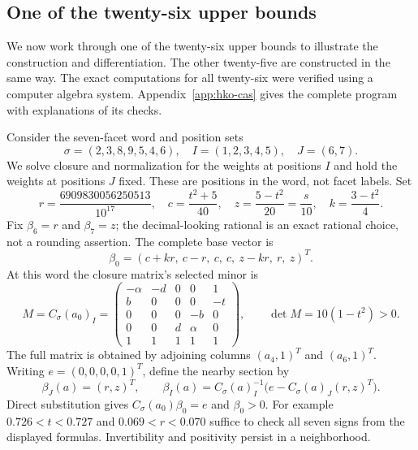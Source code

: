 \subsection*{One of the twenty-six upper bounds}

We now work through one of the twenty-six upper bounds to illustrate the
construction and differentiation. The other twenty-five are constructed
in the same way. The exact computations for all twenty-six were verified
using a computer algebra system. Appendix~\ref{app:hko-cas} gives the complete
program with explanations of its checks.

Consider the seven-facet word and position sets
\[
 \sigma=(2,3,8,9,5,4,6),\quad I=(1,2,3,4,5),\quad J=(6,7).
\]
We solve closure and normalization for the weights at positions $I$ and
hold the weights at positions $J$ fixed. These are positions in the word,
not facet labels. Set
\[
 r=\frac{6909830056250513}{10^{17}},\quad
 c=\frac{t^2+5}{40},\quad z=\frac{5-t^2}{20}=\frac{s}{10},\quad
 k=\frac{3-t^2}{4}.
\]
Fix $\beta_6=r$ and $\beta_7=z$; the decimal-looking rational is an exact rational
choice, not a rounding assertion. The complete base vector is
\[
 \beta_0=(c+kr,\ c-r,\ c,\ c,\ z-kr,\ r,\ z)^T.
\]
At this word the closure matrix's selected minor is
\[
 M=C_\sigma(a_0)_I=
 \begin{pmatrix}
 -\alpha&-d&0&0&1\\b&0&0&0&-t\\0&0&0&-b&0\\
 0&0&d&\alpha&0\\1&1&1&1&1
 \end{pmatrix},\qquad \det M=10(1-t^2)>0.
\]
The full matrix is obtained by adjoining columns $(a_4,1)^T$ and $(a_6,1)^T$.
Writing $e=(0,0,0,0,1)^T$, define the nearby section by
\[
 \beta_J(a)=(r,z)^T,\qquad
 \beta_I(a)=C_\sigma(a)_I^{-1}\bigl(e-C_\sigma(a)_J(r,z)^T\bigr).
\]
Direct substitution gives $C_\sigma(a_0)\beta_0=e$ and $\beta_0>0$.
For example $0.726<t<0.727$ and $0.069<r<0.070$ suffice to check all
seven signs from the displayed formulas. Invertibility and positivity persist
in a neighborhood.

